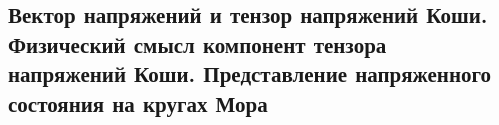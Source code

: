 

\subsection{Вектор напряжений и тензор напряжений Коши. Физический смысл компонент тензора напряжений Коши. Представление напряженного состояния на кругах Мора}



